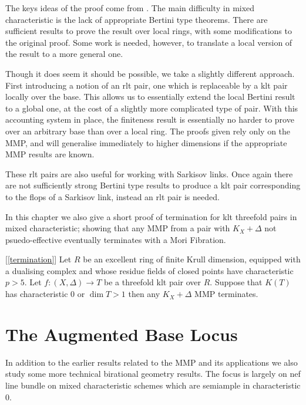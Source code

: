 \documentclass[a4paper,12pt]{book}
\let \OldSection \section
\renewcommand{\section}[1]{\OldSection{#1} \thispagestyle{section}}
\begin{document}
	The keys ideas of the proof come from \cite{BCHM10}. The main difficulty in mixed characteristic is the lack of appropriate Bertini type theorems. There are sufficient results to prove the result over local rings, with some modifications to the original proof. Some work is needed, however, to translate a local version of the result to a more general one. 
	
	Though it does seem it should be possible, we take a slightly different approach. First introducing a notion of an rlt pair, one which is replaceable by a klt pair locally over the base. This allows us to essentially extend the local Bertini result to a global one, at the cost of a slightly more complicated type of pair. With this accounting system in place, the finiteness result is essentially no harder to prove over an arbitrary base than over a local ring. The proofs given rely only on the MMP, and will generalise immediately to higher dimensions if the appropriate MMP results are known. 
	
	These rlt pairs are also useful for working with Sarkisov links. Once again there are not sufficiently strong Bertini type results to produce a klt pair corresponding to the flops of a Sarkisov link, instead an rlt pair is needed.
	
	In this chapter we also give a short proof of termination for klt threefold pairs in mixed characteristic; showing that any MMP from a pair with $K_{X}+\Delta$ not psuedo-effective eventually terminates with a Mori Fibration.
	
	\begin{theo}\label{Main_Finite3}[\autoref{termination}]
		Let $R$ be an excellent ring of finite Krull dimension, equipped with a dualising complex and whose residue fields of closed points have characteristic $p>5$.
		Let $f:(X,\Delta) \to T$ be a threefold klt pair over $R$. Suppose that $K(T)$ has characteristic $0$ or $\dim T > 1$ then any $K_{X}+\Delta$ MMP terminates.
	\end{theo}
	
	\section{The Augmented Base Locus}
	
	In addition to the earlier results related to the MMP and its applications we also study some more technical birational geometry results. The focus is largely on nef line bundle on mixed characteristic schemes which are semiample in characteristic $0$.
	
\end{document}
